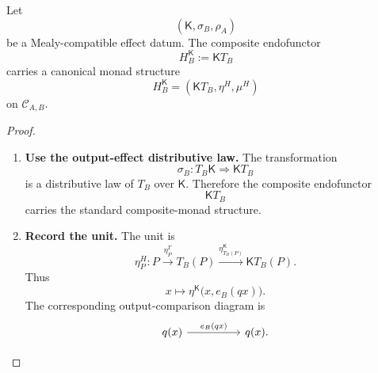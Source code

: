 \begin{proposition}
\label{prop:effectful-output-comparison-monad}
    Let
    \[
        (\mathsf K,\sigma_B,\rho_A)
    \]
    be a Mealy-compatible effect datum. The composite endofunctor
    \[
        H_B^{\mathsf K}
        :=
        \mathsf K T_B
    \]
    carries a canonical monad structure
    \[
        H_B^{\mathsf K}
        =
        (\mathsf K T_B,\eta^H,\mu^H)
    \]
    on \(\mathcal C_{A,B}\).
\end{proposition}
\begin{proof}
    \leavevmode
    \begin{enumerate}
        \item \textbf{Use the output-effect distributive law.}
        The transformation
        \[
            \sigma_B:
            T_B\mathsf K
            \Rightarrow
            \mathsf K T_B
        \]
        is a distributive law of \(T_B\) over \(\mathsf K\). Therefore the
        composite endofunctor
        \[
            \mathsf K T_B
        \]
        carries the standard composite-monad structure.

        \item \textbf{Record the unit.}
        The unit is
        \[
            \eta^H_P:
            P
            \xrightarrow{\eta^T_P}
            T_B(P)
            \xrightarrow{\eta^{\mathsf K}_{T_B(P)}}
            \mathsf K T_B(P).
        \]
        Thus
        \[
            x
            \longmapsto
            \eta^{\mathsf K}
            \bigl(x,e_B(qx)\bigr).
        \]
        The corresponding output-comparison diagram is
        \[
            \begin{tikzcd}[column sep=huge]
                    q(x)
                        \arrow[r, "e_B(qx)"]
                &
                    q(x).
            \end{tikzcd}
        \]


\end{enumerate}
\end{proof}
